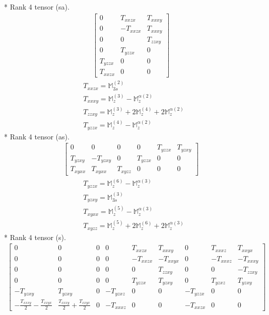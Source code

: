 \documentclass[fleqn,8pt,landscape]{jsarticle}
\begin{document}
* Rank 4 tensor (sa).
\begin{align*}
\begin{bmatrix} 0 & T_{xxzx} & T_{xxxy} \\ 0 & - T_{xxzx} & T_{xxxy} \\ 0 & 0 & T_{zzxy} \\ 0 & T_{yzzx} & 0 \\ T_{yzzx} & 0 & 0 \\ T_{xxzx} & 0 & 0 \end{bmatrix}
\end{align*}
\begin{align*}
& T_{xxzx} = \mathbb{M}_{3s}^{(2)} \\
& T_{xxxy} = \mathbb{M}_{z}^{(3)} - \mathbb{M}_{z}^{\alpha(2)} \\
& T_{zzxy} = \mathbb{M}_{z}^{(3)} + 2 \mathbb{M}_{z}^{(4)} + 2 \mathbb{M}_{z}^{\alpha(2)} \\
& T_{yzzx} = \mathbb{M}_{z}^{(4)} - \mathbb{M}_{z}^{\alpha(2)}
\end{align*}
* Rank 4 tensor (as).
\begin{align*}
\begin{bmatrix} 0 & 0 & 0 & 0 & T_{yzzx} & T_{yzxy} \\ T_{yzxy} & - T_{yzxy} & 0 & T_{yzzx} & 0 & 0 \\ T_{xyxx} & T_{xyxx} & T_{xyzz} & 0 & 0 & 0 \end{bmatrix}
\end{align*}
\begin{align*}
& T_{yzzx} = \mathbb{M}_{z}^{(6)} - \mathbb{M}_{z}^{\alpha(3)} \\
& T_{yzxy} = \mathbb{M}_{3s}^{(3)} \\
& T_{xyxx} = \mathbb{M}_{z}^{(5)} - \mathbb{M}_{z}^{\alpha(3)} \\
& T_{xyzz} = \mathbb{M}_{z}^{(5)} + 2 \mathbb{M}_{z}^{(6)} + 2 \mathbb{M}_{z}^{\alpha(3)}
\end{align*}
* Rank 4 tensor (s).
\begin{align*}
\begin{bmatrix} 0 & 0 & 0 & 0 & T_{xxzx} & T_{xxxy} & 0 & T_{xxxz} & T_{xxyx} \\ 0 & 0 & 0 & 0 & - T_{xxzx} & - T_{xxyx} & 0 & - T_{xxxz} & - T_{xxxy} \\ 0 & 0 & 0 & 0 & 0 & T_{zzxy} & 0 & 0 & - T_{zzxy} \\ 0 & 0 & 0 & 0 & T_{yzzx} & T_{yzxy} & 0 & T_{yzxz} & T_{yzxy} \\ - T_{yzxy} & T_{yzxy} & 0 & - T_{yzxz} & 0 & 0 & - T_{yzzx} & 0 & 0 \\ - \frac{T_{xxxy}}{2} - \frac{T_{xxyx}}{2} & \frac{T_{xxxy}}{2} + \frac{T_{xxyx}}{2} & 0 & - T_{xxxz} & 0 & 0 & - T_{xxzx} & 0 & 0 \end{bmatrix}
\end{align*}
\end{document}
